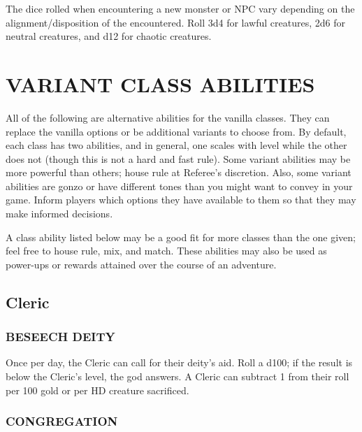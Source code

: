 \documentclass[twoside]{article}
\begin{document}
The dice rolled when encountering a new monster or NPC vary depending on the alignment/disposition of the encountered. Roll 3d4 for lawful creatures, 2d6 for neutral creatures, and d12 for chaotic creatures.

\section*{VARIANT CLASS ABILITIES}

All of the following are alternative abilities for the vanilla classes. They can replace the vanilla options or be additional variants to choose from. By default, each class has two abilities, and in general, one scales with level while the other does not (though this is not a hard and fast rule). Some variant abilities may be more powerful than others; house rule at Referee's discretion. Also, some variant abilities are gonzo or have different tones than you might want to convey in your game. Inform players which options they have available to them so that they may make informed decisions.

\bigbreak

A class ability listed below may be a good fit for more classes than the one given; feel free to house rule, mix, and match. These abilities may also be used as power-ups or rewards attained over the course of an adventure.

\subsection*{Cleric}

\subsubsection*{\footnotesize{B}\scriptsize{ESEECH} \footnotesize{D}\scriptsize{EITY}\normalsize}

Once per day, the Cleric can call for their deity's aid. Roll a d100; if the result is below the Cleric's level, the god answers. A Cleric can subtract 1 from their roll per 100 gold or per HD creature sacrificed.

\subsubsection*{\footnotesize{C}\scriptsize{ONGREGATION}\normalsize}
\end{document}
